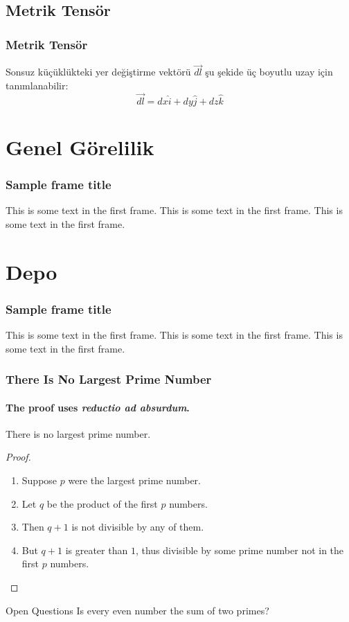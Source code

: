 \documentclass[aspectratio=169]{beamer}
\begin{document}
    \subsection{Metrik Tensör}
    \begin{frame}
        \frametitle{Metrik Tensör}
        
        Sonsuz küçüklükteki yer değiştirme vektörü \(\vec{dl}\) şu şekide üç boyutlu uzay için tanımlanabilir: 
        \begin{equation*}
            \vec{dl} = dx\hat{i} + dy\hat{j} + dz\hat{k}
        \end{equation*}
        
    \end{frame}



\section{Genel Görelilik}

\begin{frame}
    \frametitle{Sample frame title}
    
    This is some text in the first frame. This is some text in the first frame. This is some text in the first frame.

\end{frame}




\section{Depo}
\begin{frame}
    \frametitle{Sample frame title}
    
    This is some text in the first frame. This is some text in the first frame. This is some text in the first frame.
\end{frame}

\begin{frame}
    \frametitle{There Is No Largest Prime Number}
    \framesubtitle{The proof uses \textit{reductio ad absurdum}.}
    \begin{theorem}
    There is no largest prime number.
    \end{theorem}
    \begin{proof}
    \begin{enumerate}
    \item<1-> Suppose $p$ were the largest prime number.
    \item<2-> Let $q$ be the product of the first $p$ numbers.
    \item<3-> Then $q + 1$ is not divisible by any of them.
    \item<1-> But $q + 1$ is greater than $1$, thus divisible by some prime
    number not in the first $p$ numbers.\qedhere
    \end{enumerate}
    \end{proof}
    \begin{block}{Open Questions}
        Is every even number the sum of two primes?
        \cite{Goldbach1742}
    \end{block}
\end{frame}
\end{document}
